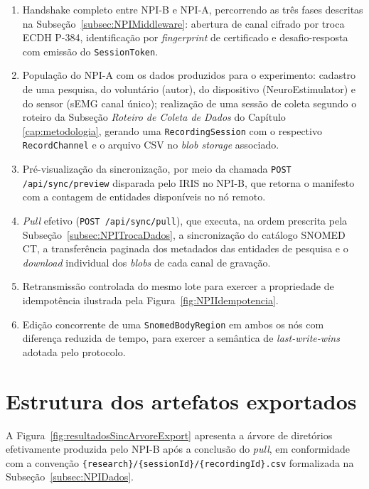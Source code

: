 \begin{enumerate}
    \item Handshake completo entre NPI-B e NPI-A, percorrendo
    as três fases descritas na Subseção~\ref{subsec:NPIMiddleware}:
    abertura de canal cifrado por troca ECDH P-384, identificação por
    \textit{fingerprint} de certificado e desafio-resposta com
    emissão do \texttt{SessionToken}.
    \item População do NPI-A com os dados produzidos para
    o experimento: cadastro de uma pesquisa, do voluntário (autor),
    do dispositivo (NeuroEstimulator) e do sensor (sEMG canal único);
    realização de uma sessão de coleta segundo o roteiro da
    Subseção \textit{Roteiro de Coleta de Dados} do Capítulo
    \ref{cap:metodologia}, gerando uma \texttt{RecordingSession} com
    o respectivo \texttt{RecordChannel} e o arquivo CSV no
    \textit{blob storage} associado.
    \item Pré-visualização da sincronização, por meio da
    chamada \texttt{POST /api/sync/preview} disparada pelo IRIS no
    NPI-B, que retorna o manifesto com a contagem de entidades
    disponíveis no nó remoto.
    \item \textit{Pull} efetivo (\texttt{POST /api/sync/pull}),
    que executa, na ordem prescrita pela
    Subseção~\ref{subsec:NPITrocaDados}, a sincronização do
    catálogo SNOMED CT, a transferência paginada dos metadados das
    entidades de pesquisa e o \textit{download} individual dos
    \textit{blobs} de cada canal de gravação.
    \item Retransmissão controlada do mesmo lote para
    exercer a propriedade de idempotência ilustrada pela
    Figura~\ref{fig:NPIIdempotencia}.
    \item Edição concorrente de uma \texttt{SnomedBodyRegion}
    em ambos os nós com diferença reduzida de tempo, para exercer a
    semântica de \textit{last-write-wins} adotada pelo protocolo.
\end{enumerate}

\section{Estrutura dos artefatos exportados}\label{sec:resultadosSincExport}

A Figura~\ref{fig:resultadosSincArvoreExport} apresenta a árvore de
diretórios efetivamente produzida pelo NPI-B após a conclusão do
\textit{pull}, em conformidade com a convenção
\texttt{\{research\}/\{sessionId\}/\{recordingId\}.csv} formalizada
na Subseção~\ref{subsec:NPIDados}.

